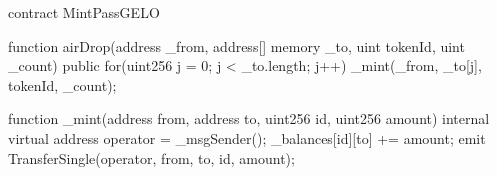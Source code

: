 contract MintPassGELO {
  function airDrop(address _from, address[] memory _to, uint tokenId, uint _count) public {      
    for(uint256 j = 0; j < _to.length; j++){
      _mint(_from, _to[j], tokenId, _count);
    }
  }

  function _mint(address from, address to, uint256 id, uint256 amount) internal virtual {
    address operator = _msgSender();
    _balances[id][to] += amount;
    emit TransferSingle(operator, from, to, id, amount);
  }
}